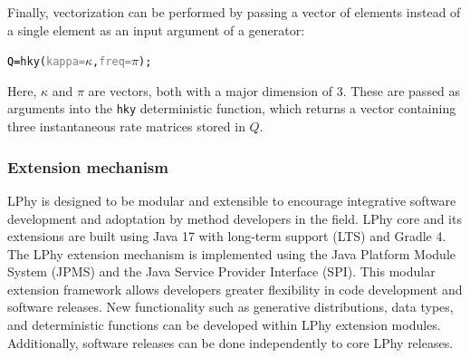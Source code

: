 \documentclass[10pt,letterpaper,table]{article}
\theoremstyle{definition}
\begin{document}
Finally, vectorization can be performed by passing a vector of elements instead of a single element as an input argument of a generator:

{\small
\begin{alltt}
    \textcolor{black}{Q = }\textcolor{generator}{hky}(\textcolor{gray}{kappa=}\textcolor{bluishgreen}{\(\kappa\)}, \textcolor{gray}{freq=}\textcolor{bluishgreen}{\(\pi\)});
\end{alltt} 
}

Here, $\kappa$ and $\pi$ are vectors, both with a major dimension of 3. 
These are passed as arguments into the \texttt{hky} deterministic function, which returns a vector containing three instantaneous rate matrices stored in $Q$.

\subsubsection{Extension mechanism}
LPhy is designed to be modular and extensible to encourage integrative software development and adoptation by method developers in the field. 
LPhy core and its extensions are built using Java 17 with long-term support (LTS) and Gradle 4. 
The LPhy extension mechanism is implemented using the Java Platform Module System (JPMS) and the Java Service Provider Interface (SPI).
This modular extension framework allows developers greater flexibility in code development and software releases. 
New functionality such as generative distributions, data types, and deterministic functions can be developed within LPhy extension modules. 
Additionally, software releases can be done independently to core LPhy releases. 


\end{document}
